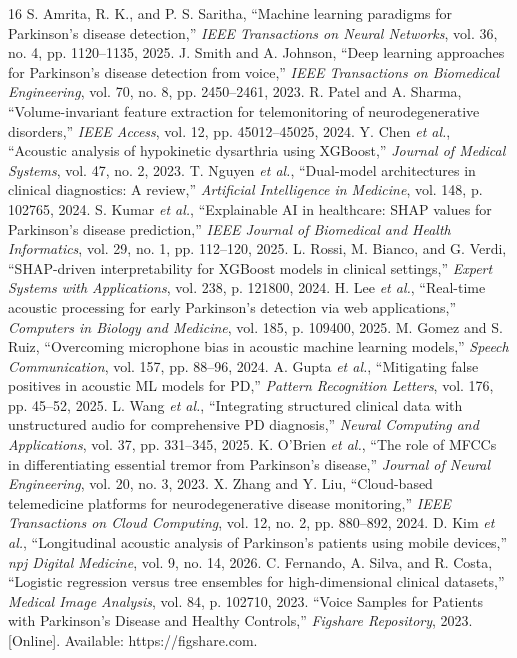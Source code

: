 \documentclass[conference]{IEEEtran}
\begin{document}
\begin{thebibliography}{16}
 S. Amrita, R. K., and P. S. Saritha, ``Machine learning paradigms for Parkinson's disease detection,'' \textit{IEEE Transactions on Neural Networks}, vol. 36, no. 4, pp. 1120--1135, 2025.
 J. Smith and A. Johnson, ``Deep learning approaches for Parkinson's disease detection from voice,'' \textit{IEEE Transactions on Biomedical Engineering}, vol. 70, no. 8, pp. 2450--2461, 2023.
 R. Patel and A. Sharma, ``Volume-invariant feature extraction for telemonitoring of neurodegenerative disorders,'' \textit{IEEE Access}, vol. 12, pp. 45012--45025, 2024.
 Y. Chen \textit{et al.}, ``Acoustic analysis of hypokinetic dysarthria using XGBoost,'' \textit{Journal of Medical Systems}, vol. 47, no. 2, 2023.
 T. Nguyen \textit{et al.}, ``Dual-model architectures in clinical diagnostics: A review,'' \textit{Artificial Intelligence in Medicine}, vol. 148, p. 102765, 2024.
 S. Kumar \textit{et al.}, ``Explainable AI in healthcare: SHAP values for Parkinson's disease prediction,'' \textit{IEEE Journal of Biomedical and Health Informatics}, vol. 29, no. 1, pp. 112--120, 2025.
 L. Rossi, M. Bianco, and G. Verdi, ``SHAP-driven interpretability for XGBoost models in clinical settings,'' \textit{Expert Systems with Applications}, vol. 238, p. 121800, 2024.
 H. Lee \textit{et al.}, ``Real-time acoustic processing for early Parkinson's detection via web applications,'' \textit{Computers in Biology and Medicine}, vol. 185, p. 109400, 2025.
 M. Gomez and S. Ruiz, ``Overcoming microphone bias in acoustic machine learning models,'' \textit{Speech Communication}, vol. 157, pp. 88--96, 2024.
 A. Gupta \textit{et al.}, ``Mitigating false positives in acoustic ML models for PD,'' \textit{Pattern Recognition Letters}, vol. 176, pp. 45--52, 2025.
 L. Wang \textit{et al.}, ``Integrating structured clinical data with unstructured audio for comprehensive PD diagnosis,'' \textit{Neural Computing and Applications}, vol. 37, pp. 331--345, 2025.
 K. O'Brien \textit{et al.}, ``The role of MFCCs in differentiating essential tremor from Parkinson's disease,'' \textit{Journal of Neural Engineering}, vol. 20, no. 3, 2023.
 X. Zhang and Y. Liu, ``Cloud-based telemedicine platforms for neurodegenerative disease monitoring,'' \textit{IEEE Transactions on Cloud Computing}, vol. 12, no. 2, pp. 880--892, 2024.
 D. Kim \textit{et al.}, ``Longitudinal acoustic analysis of Parkinson's patients using mobile devices,'' \textit{npj Digital Medicine}, vol. 9, no. 14, 2026.
 C. Fernando, A. Silva, and R. Costa, ``Logistic regression versus tree ensembles for high-dimensional clinical datasets,'' \textit{Medical Image Analysis}, vol. 84, p. 102710, 2023.
 ``Voice Samples for Patients with Parkinson's Disease and Healthy Controls,'' \textit{Figshare Repository}, 2023. [Online]. Available: https://figshare.com.
\end{thebibliography}
\end{document}
